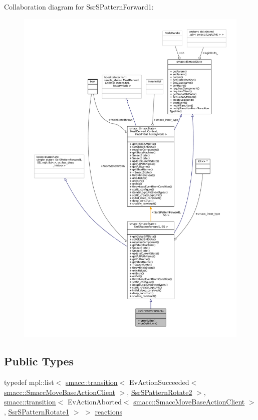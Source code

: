 Collaboration diagram for Ssr\+S\+Pattern\+Forward1\+:
\nopagebreak
\begin{figure}[H]
\begin{center}
\leavevmode
\includegraphics[width=350pt]{structSsrSPatternForward1__coll__graph}
\end{center}
\end{figure}
\subsection*{Public Types}
\begin{DoxyCompactItemize}
\item 
typedef mpl\+::list$<$ \hyperlink{classsmacc_1_1transition}{smacc\+::transition}$<$ Ev\+Action\+Succeeded$<$ \hyperlink{classsmacc_1_1SmaccMoveBaseActionClient}{smacc\+::\+Smacc\+Move\+Base\+Action\+Client} $>$, \hyperlink{structSsrSPatternRotate2}{Ssr\+S\+Pattern\+Rotate2} $>$, \hyperlink{classsmacc_1_1transition}{smacc\+::transition}$<$ Ev\+Action\+Aborted$<$ \hyperlink{classsmacc_1_1SmaccMoveBaseActionClient}{smacc\+::\+Smacc\+Move\+Base\+Action\+Client} $>$, \hyperlink{structSsrSPatternRotate1}{Ssr\+S\+Pattern\+Rotate1} $>$ $>$ \hyperlink{structSsrSPatternForward1_a1717ab1af0fa7fae0ad608d6eac1b919}{reactions}
\end{DoxyCompactItemize}

